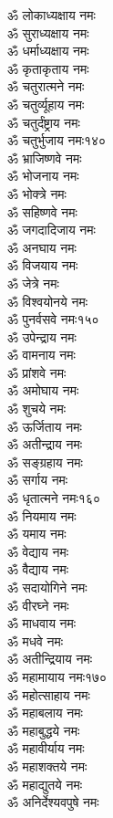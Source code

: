 \begin{multicols}{2}
\begin{flushleft}
ॐ लोकाध्यक्षाय नमः\\
ॐ सुराध्यक्षाय नमः\\
ॐ धर्माध्यक्षाय नमः\\
ॐ कृताकृताय नमः\\
ॐ चतुरात्मने नमः\\
ॐ चतुर्व्यूहाय नमः\\
ॐ चतुर्दंष्ट्राय नमः\\
ॐ चतुर्भुजाय नमः\hfill १४०\\
ॐ भ्राजिष्णवे नमः\\
ॐ भोजनाय नमः\\
ॐ भोक्त्रे नमः\\
ॐ सहिष्णवे नमः\\
ॐ जगदादिजाय नमः\\
ॐ अनघाय नमः\\
ॐ विजयाय नमः\\
ॐ जेत्रे नमः\\
ॐ विश्वयोनये नमः\\
ॐ पुनर्वसवे नमः\hfill १५०\\
ॐ उपेन्द्राय नमः\\
ॐ वामनाय नमः\\
ॐ प्रांशवे नमः\\
ॐ अमोघाय नमः\\
ॐ शुचये नमः\\
ॐ ऊर्जिताय नमः\\
ॐ अतीन्द्राय नमः\\
ॐ सङ्ग्रहाय नमः\\
ॐ सर्गाय नमः\\
ॐ धृतात्मने नमः\hfill १६०\\
ॐ नियमाय नमः\\
ॐ यमाय नमः\\
ॐ वेद्याय नमः\\
ॐ वैद्याय नमः\\
ॐ सदायोगिने नमः\\
ॐ वीरघ्ने नमः\\
ॐ माधवाय नमः\\
ॐ मधवे नमः\\
ॐ अतीन्द्रियाय नमः\\
ॐ महामायाय नमः\hfill १७०\\
ॐ महोत्साहाय नमः\\
ॐ महाबलाय नमः\\
ॐ महाबुद्धये नमः\\
ॐ महावीर्याय नमः\\
ॐ महाशक्तये नमः\\
ॐ महाद्युतये नमः\\
ॐ अनिर्देश्यवपुषे नमः\\

\end{flushleft}
\end{multicols}

